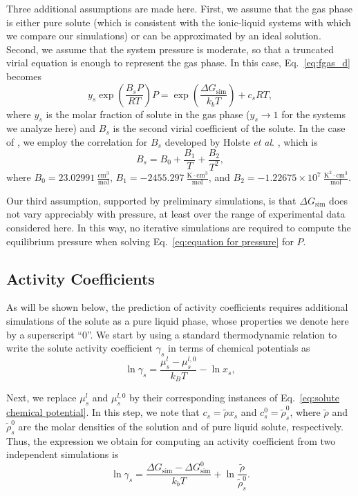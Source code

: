 \documentclass[3p,twocolumn]{elsarticle}
\begin{document}
Three additional assumptions are made here. First, we assume that the gas phase is either pure solute (which is consistent with the ionic-liquid systems with which we compare our simulations) or can be approximated by an ideal solution. Second, we assume that the system pressure is moderate, so that a truncated virial equation is enough to represent the gas phase. In this case, Eq.~\eqref{eq:fgas_d} becomes
\begin{equation}
\label{eq:equation for pressure}
y_s \exp\left( \frac{B_s P}{R T} \right) P = \exp \left( \frac{\Delta G_\text{sim}}{k_b T} \right) +  c_s R T,
\end{equation}
where $y_s$ is the molar fraction of solute in the gas phase ($y_s \rightarrow 1$ for the systems we analyze here) and $B_s$ is the second virial coefficient of the solute.
In the case of , we employ the correlation for $B_s$ developed by Holste \textit{et al}. \cite{Holste_1987}, which is
\begin{equation}
B_s = B_0 + \frac{B_1}{T} + \frac{B_2}{T^2},
\end{equation}
where $B_0 = 23.02991~\mathrm{\frac{cm^3}{mol}}$, $B_1 = -2455.297~\mathrm{\frac{K \cdot cm^3}{mol}}$, and $B_2 = -1.22675 \times 10^7~\mathrm{\frac{K^2 \cdot cm^3}{mol}}$.

Our third assumption, supported by preliminary simulations, is that $\Delta G_\text{sim}$ does not vary appreciably with pressure, at least over the range of experimental data considered here.
In this way, no iterative simulations are required to compute the equilibrium pressure when solving Eq.~\eqref{eq:equation for pressure} for $P$.

\subsection*{Activity Coefficients}

As will be shown below, the prediction of activity coefficients requires additional simulations of the solute as a pure liquid phase, whose properties we denote here by a superscript ``$0$''.
We start by using a standard thermodynamic relation \cite{Tester} to write the solute activity coefficient $\gamma_s$ in terms of chemical potentials as
\begin{equation}
\label{eq:gamma}
\ln \gamma_s = \frac{\mu_s^l - \mu_s^{l,0}}{k_B T} - \ln x_s,
\end{equation}

Next, we replace $\mu_s^l$ and $\mu_s^{l,0}$ by their corresponding instances of Eq.~\eqref{eq:solute chemical potential}. In this step, we note that $c_s = \tilde{\rho} x_s$ and $c_s^0 = \tilde{\rho}_s^0$, where $\tilde{\rho}$ and $\tilde{\rho}_s^0$ are the molar densities of the solution and of pure liquid solute, respectively. Thus, the expression we obtain for computing an activity coefficient from two independent simulations is
\begin{equation}
\ln \gamma_s = \frac{\Delta G_\text{sim} - \Delta G_\text{sim}^{0}}{k_b T} + \ln \frac{\tilde{\rho}}{\tilde{\rho}_s^0}.
\end{equation}
\end{document}

